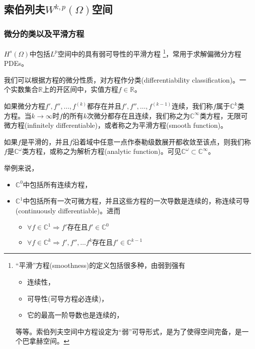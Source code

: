 \subsection{索伯列夫\texorpdfstring{$W^{k,p}(\Omega)$}{(W)}空间}

\subsubsection{微分的类以及平滑方程}
$H^s(\Omega)$中包括$L^p$空间中的具有弱可导性的平滑方程
\footnote{``平滑''方程(smoothness)的定义包括很多种，由弱到强有
\begin{itemize}
  \item 连续性，
  \item 可导性(可导方程必连续)，
  \item 它的最高一阶导数也是连续的，
\end{itemize}
等等。索伯列夫空间中方程设定为``弱''可导形式，是为了使得空间完备，是一个巴拿赫空间。
}，常用于求解偏微分方程PDEs。

\begin{definition}[微分的类以及平滑方程]
  \label{eq:soblev-differentiability-classification}
  我们可以根据方程的微分性质，对方程作分类(differentiability classification)。一个实数集合$\mathbb{R}$上的开区间中，实值方程$f \in \mathbb{R}$。

  如果微分方程$f',f'',\ldots,f^{(k)}$都存在并且$f',f'',\ldots,f^{(k-1)}$连续，我们称$f$属于$\mathbb{C}^{k}$类方程。当$k\rightarrow \infty$时$f$的所有$k$次微分都存在且连续，我们称之为$\mathbb{C}^{\infty}$类方程，无限可微方程(infinitely differentiable)，或者称之为平滑方程(smooth function)。

  如果$f$是平滑的，并且$f$沿着域中任意一点作泰勒级数展开都收敛至该点，则我们称$f$是$\mathbb{C}^{\omega}$类方程，或称之为解析方程(analytic function)。可见$\mathbb{C}^{\omega} \subset \mathbb{C}^{\infty}$。

  举例来说，
  \begin{itemize}
    \item $\mathbb{C}^0$中包括所有连续方程，
    \item $\mathbb{C}^1$中包括所有一次可微方程，并且这些方程的一次导数是连续的，称连续可导(continuously differentiable)。进而
    \begin{itemize}
      \item  $\forall f \in \mathbb{C}^1 \Rightarrow f'\text{存在且}f' \in \mathbb{C}^0$
      \item $\forall f \in \mathbb{C}^k \Rightarrow f', f'', \ldots f^{k} \text{存在且}f' \in \mathbb{C}^{k-1}$
    \end{itemize}
    \end{itemize}
\end{definition}

